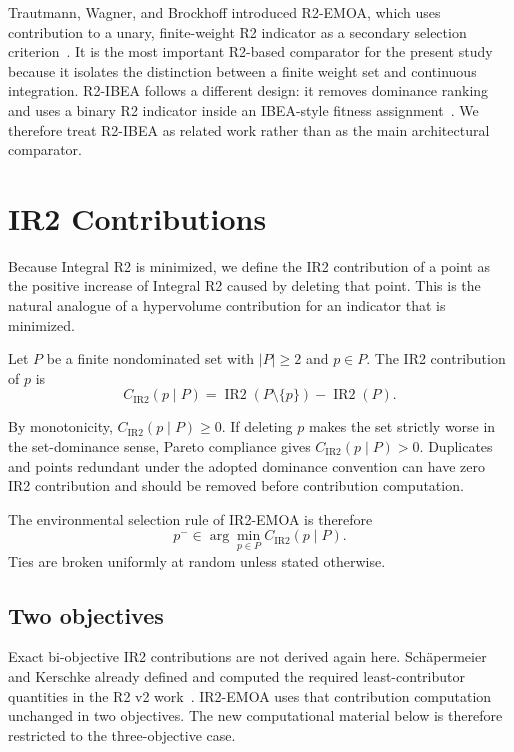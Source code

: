 \documentclass[runningheads]{llncs}
\newcommand{\IR}{\operatorname{IR2}}
\newcommand{\cIR}{C_{\IR}}
\begin{document}
Trautmann, Wagner, and Brockhoff introduced R2-EMOA, which uses contribution to a unary, finite-weight R2 indicator as a secondary selection criterion~\cite{TrautmannWagnerBrockhoff2013}. It is the most important R2-based comparator for the present study because it isolates the distinction between a finite weight set and continuous integration. R2-IBEA follows a different design: it removes dominance ranking and uses a binary R2 indicator inside an IBEA-style fitness assignment~\cite{PhanSuzuki2013}. We therefore treat R2-IBEA as related work rather than as the main architectural comparator.

\section{IR2 Contributions}
\label{sec:contributions}

Because Integral R2 is minimized, we define the IR2 contribution of a point as the positive increase of Integral R2 caused by deleting that point. This is the natural analogue of a hypervolume contribution for an indicator that is minimized.

\begin{definition}[IR2 contribution]
Let $P$ be a finite nondominated set with $|P|\ge2$ and $p\in P$. The IR2 contribution of $p$ is
\begin{equation}
\label{eq:deletion-loss}
    \cIR(p\mid P)
    =\IR(P\setminus\{p\})-\IR(P).
\end{equation}
\end{definition}

By monotonicity, $\cIR(p\mid P)\ge0$. If deleting $p$ makes the set strictly worse in the set-dominance sense, Pareto compliance gives $\cIR(p\mid P)>0$. Duplicates and points redundant under the adopted dominance convention can have zero IR2 contribution and should be removed before contribution computation.

The environmental selection rule of IR2-EMOA is therefore
\begin{equation}
\label{eq:least-ir2}
    p^-\in\arg\min_{p\in P}\cIR(p\mid P).
\end{equation}
Ties are broken uniformly at random unless stated otherwise.

\subsection{Two objectives}
\label{subsec:2d}

Exact bi-objective IR2 contributions are not derived again here. Sch\"apermeier and Kerschke already defined and computed the required least-contributor quantities in the R2 v2 work~\cite{SchaepermeierKerschke2025}. IR2-EMOA uses that contribution computation unchanged in two objectives. The new computational material below is therefore restricted to the three-objective case.
\end{document}

